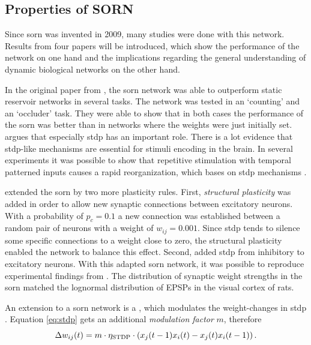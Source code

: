 \subsection{Properties of SORN}
\label{sec:prop-sorn}

Since \acs{sorn} was invented in 2009, many studies were done with this network. Results from four papers will be introduced, which show the performance of the network on one hand and the implications regarding the general understanding of dynamic biological networks on the other hand.

In the original paper from \textcite{lazar2009sorn}, the \acs{sorn} network was able to outperform static reservoir networks in several tasks. The network was tested in an `counting' and an `occluder' task. They were able to show that in both cases the performance of the \acs{sorn} was better than in networks where the weights were just initially set. \textcite{lazar2009sorn} argues that especially \ac{stdp} has an important role. There is a lot evidence that \ac{stdp}-like mechanisms are essential for stimuli encoding in the brain. In several experiments it was possible to show that repetitive stimulation with temporal patterned inputs causes a rapid reorganization, which bases on \ac{stdp} mechanisms \parencite{yao2001stimulus, fu2002temporal, yao2007rapid}.

\textcite{zheng2013network} extended the \ac{sorn} by two more plasticity rules. First, \emph{structural plasticity} was added in order to allow new synaptic connections between excitatory neurons. With a probability of $p_c = 0.1$ a new connection was established between a random pair of neurons with a weight of $w_{ij} = 0.001$. Since \ac{stdp} tends to silence some specific connections to a weight close to zero, the structural plasticity enabled the network to balance this effect. Second,  added \ac{stdp} from inhibitory to excitatory neurons. With this adapted \ac{sorn} network, it was possible to reproduce experimental findings from \textcite{yasumatsu2008principles}. The distribution of synaptic weight strengths in the \ac{sorn} matched the lognormal distribution of EPSPs in the visual cortex of rats.

An extension to a \acs{sorn} network is a , which modulates the weight-changes in \ac{stdp} \parencite{aswolinskiy2015rm}. Equation \eqref{eq:stdp} gets an additional \emph{modulation factor} $m$, therefore
%
\begin{equation}
\label{eq:stdp-modulated}
\Delta w_{ij}(t) = m \cdot \eta_{\text{STDP}} \cdot \left( x_j(t-1) x_i(t) - x_j(t) x_i(t-1) \right).
\end{equation}

